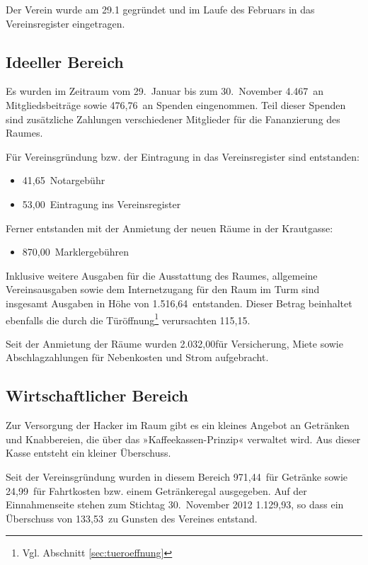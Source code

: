 \documentclass[10pt,DIV16]{scrartcl}
\begin{document}
Der Verein wurde am 29.1 gegründet und im Laufe des Februars in das 
Vereinsregister eingetragen. 

\subsection{Ideeller Bereich} 

Es wurden im Zeitraum vom 29.~Januar bis zum 30.~November 4.467\EUR\ 
an Mitgliedsbeiträge sowie 476,76\EUR\ an Spenden eingenommen. Teil 
dieser Spenden sind zusätzliche Zahlungen verschiedener Mitglieder 
für die Fananzierung des Raumes. 

Für Vereinsgründung bzw. der Eintragung in das Vereinsregister sind 
entstanden: 

\begin{itemize}
	\item 41,65\EUR\ Notargebühr
	\item 53,00\EUR\ Eintragung ins Vereinsregister
\end{itemize}

\noindent{} Ferner entstanden mit der Anmietung der neuen Räume in 
der Krautgasse:

\begin{itemize}
	\item 870,00\EUR\ Marklergebühren
\end{itemize}

Inklusive weitere Ausgaben für die Ausstattung des Raumes, 
allgemeine Vereinsausgaben sowie dem Internetzugang für den Raum im 
Turm sind insgesamt Ausgaben in Höhe von 1.516,64\EUR\ entstanden. 
Dieser Betrag beinhaltet ebenfalls die durch die Türöffnung\footnote
{Vgl. Abschnitt \ref{sec:tueroeffnung}} verursachten 115,15\EUR.

Seit der Anmietung der Räume wurden 2.032,00\EUR für Versicherung, 
Miete sowie Abschlagzahlungen für Nebenkosten und Strom aufgebracht. 

\subsection{Wirtschaftlicher Bereich}

Zur Versorgung der Hacker im Raum gibt es ein kleines Angebot an Getränken und Knabbereien, die über das »Kaffeekassen-Prinzip« verwaltet wird. Aus dieser Kasse entsteht ein kleiner Überschuss. 

Seit der Vereinsgründung wurden in diesem Bereich 971,44\EUR\ für 
Getränke sowie 24,99\EUR\ für Fahrtkosten bzw. einem Getränkeregal 
ausgegeben. Auf der Einnahmenseite stehen zum Stichtag 30.~November 
2012 1.129,93\EUR, so dass ein Überschuss von 133,53\EUR\ zu Gunsten 
des Vereines entstand. 
\end{document}
